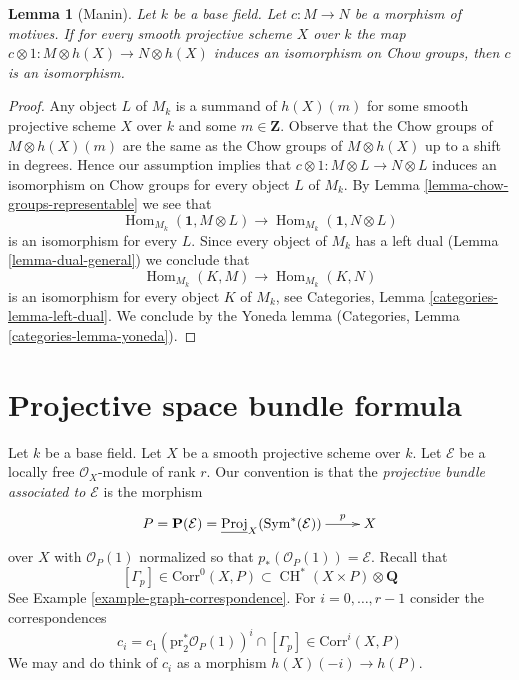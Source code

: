\documentclass{stacks-project}
\theoremstyle{plain}
\newtheorem{lemma}[subsection]{Lemma}
\theoremstyle{definition}
\theoremstyle{remark}
\numberwithin{equation}{subsection}
\def\Hom{\mathop{\mathrm{Hom}}\nolimits}
\def\CH{\mathop{\mathrm{CH}}\nolimits}
\begin{document}
\begin{lemma}[Manin]
\label{lemma-manin}
Let $k$ be a base field. Let $c : M \to N$ be a morphism of motives.
If for every smooth projective scheme $X$ over $k$ the map
$c \otimes 1 : M \otimes h(X) \to N \otimes h(X)$ induces an isomorphism on
Chow groups, then $c$ is an isomorphism.
\end{lemma}

\begin{proof}
Any object $L$ of $M_k$ is a summand of $h(X)(m)$ for some smooth projective
scheme $X$ over $k$ and some $m \in \mathbf{Z}$. Observe that the Chow groups
of $M \otimes h(X)(m)$ are the same as the Chow groups of $M \otimes h(X)$
up to a shift in degrees. Hence our assumption implies
that $c \otimes 1 : M \otimes L \to N \otimes L$ induces an isomorphism on
Chow groups for every object $L$ of $M_k$. By
Lemma \ref{lemma-chow-groups-representable}
we see that
$$
\Hom_{M_k}(\mathbf{1}, M \otimes L) \to
\Hom_{M_k}(\mathbf{1}, N \otimes L)
$$
is an isomorphism for every $L$. Since every object of $M_k$ has a left dual
(Lemma \ref{lemma-dual-general}) we conclude that
$$
\Hom_{M_k}(K, M) \to \Hom_{M_k}(K, N)
$$
is an isomorphism for every object $K$ of $M_k$, see
Categories, Lemma \ref{categories-lemma-left-dual}.
We conclude by the Yoneda lemma
(Categories, Lemma \ref{categories-lemma-yoneda}).
\end{proof}




\section{Projective space bundle formula}
\label{section-projective-space-bundle}

\noindent
Let $k$ be a base field. Let $X$ be a smooth projective scheme over $k$.
Let $\mathcal{E}$ be a locally free $\mathcal{O}_X$-module of rank $r$.
Our convention is that the {\it projective bundle associated to
$\mathcal{E}$} is the morphism
$$
\xymatrix{
P = \mathbf{P}(\mathcal{E}) =
\underline{\text{Proj}}_X(\text{Sym}^*(\mathcal{E}))
\ar[r]^-p
& X
}
$$
over $X$ with $\mathcal{O}_P(1)$ normalized so that
$p_*(\mathcal{O}_P(1)) = \mathcal{E}$. Recall that
$$
[\Gamma_p] \in \text{Corr}^0(X, P) \subset \CH^*(X \times P) \otimes \mathbf{Q}
$$
See Example \ref{example-graph-correspondence}.
For $i = 0, \ldots, r - 1$ consider the correspondences
$$
c_i = c_1(\text{pr}_2^*\mathcal{O}_P(1))^i \cap [\Gamma_p]
\in \text{Corr}^i(X, P)
$$
We may and do think of $c_i$ as a morphism $h(X)(-i) \to h(P)$.
\end{document}

